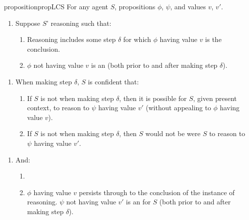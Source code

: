 \begin{note}
  \begin{restatable}{proposition}{propLCS}
    \label{prop:lcs}
    \label{prem:ni}
    For any agent \(S\), propositions \(\phi\), \(\psi\), and values \(v\), \(v'\).

    \begin{enumerate}[ref=\named{\LCSAcro{}:\arabic*}, series=LCS_counter]
    \item
      \label{nI:background}
      Suppose \(S\)' reasoning such that:
      \begin{enumerate}[label=\alph*., ref=\named{\LCSAcro{}:1\alph*}]
      \item
        \label{nI:background:step}
        Reasoning includes some step \(\delta\) for which \(\phi\) having value \(v\) is the conclusion.
      \item
        \(\phi\) not having value \(v\) is an \ep{} (both prior to and after making step \(\delta\)).
      \end{enumerate}
    \end{enumerate}

    \begin{enumerate}[ref=\named{\LCSAcro{}:\arabic*}, resume*=LCS_counter]
    \item
      \label{nI:inclusion}
      When making step \(\delta\), \(S\) is confident that:
      \begin{enumerate}[label=\alph*., ref=\named{\LCSAcro{}:2\alph*}]
      \item
        \label{nI:inclusion:position}
        If \(S\) is not \misled{} when making step \(\delta\), then it is possible for \(S\), given present context, to reason to \(\psi\) having value \(v'\) (without appealing to \(\phi\) having value \(v\)).
      \item
        \label{nI:inclusion:bound}
        If \(S\) is not \misled{} when making step \(\delta\), then \(S\) would not be \misled{} were \(S\) to reason to \(\psi\) having value \(v'\).
      \end{enumerate}
    \end{enumerate}

    \begin{enumerate}[ref=\named{\LCSAcro{}:\arabic*}, resume*=LCS_counter]
    \item
      \label{nI:going-by-value}
      And:
      \begin{enumerate}[label=\alph*., ref=\named{\LCSAcro{}:3\alph*}]
      \item
      \item
        \(\phi\) having value \(v\) persists through to the conclusion of the instance of reasoning.
        \label{nI:goingbyvalue:psi}
        \(\psi\) not having value \(v'\) is an \ep{} for \(S\) (both prior to and after making step \(\delta\)).
      \end{enumerate}
    \end{enumerate}


\end{restatable}
\end{note}
